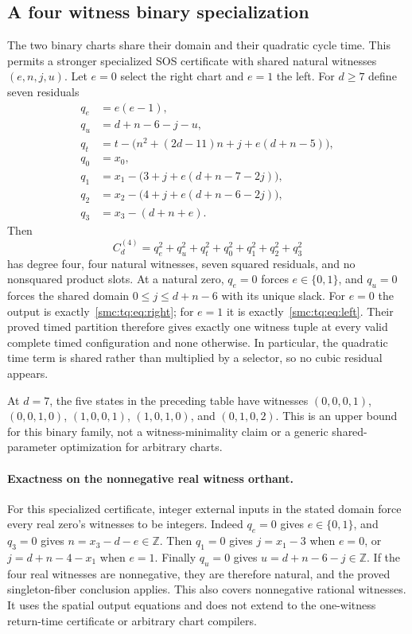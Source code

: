 \documentclass[11pt,letterpaper]{article}
\numberwithin{equation}{section}
\theoremstyle{definition}
\theoremstyle{remark}
\newcommand{\Z}{\mathbb Z}
\begin{document}
\subsection{A four witness binary specialization}\label{smc:tq:sec:fourwitness}
The two binary charts share their domain and their quadratic cycle time.
This permits a stronger specialized SOS certificate with shared natural
witnesses $(e,n,j,u)$. Let $e=0$ select the right chart and $e=1$ the left.
For $d\ge7$ define seven residuals
\begin{align*}
 q_e&=e(e-1),\\
 q_u&=d+n-6-j-u,\\
 q_t&=t-\bigl(n^2+(2d-11)n+j+e(d+n-5)\bigr),\\
 q_0&=x_0,\\
 q_1&=x_1-\bigl(3+j+e(d+n-7-2j)\bigr),\\
 q_2&=x_2-\bigl(4+j+e(d+n-6-2j)\bigr),\\
 q_3&=x_3-(d+n+e).
\end{align*}
Then
\[
 C_d^{(4)}=q_e^2+q_u^2+q_t^2+q_0^2+q_1^2+q_2^2+q_3^2
\]
has degree four, four natural witnesses, seven squared residuals, and no
nonsquared product slots. At a natural zero, $q_e=0$ forces $e\in\{0,1\}$,
and $q_u=0$ forces the shared domain $0\le j\le d+n-6$ with its unique
slack. For $e=0$ the output is exactly~\eqref{smc:tq:eq:right}; for $e=1$ it is
exactly~\eqref{smc:tq:eq:left}. Their proved timed partition therefore gives exactly
one witness tuple at every valid complete timed configuration and none
otherwise. In particular, the quadratic time term is shared rather than
multiplied by a selector, so no cubic residual appears.

At $d=7$, the five states in the preceding table have witnesses
$(0,0,0,1)$, $(0,0,1,0)$, $(1,0,0,1)$, $(1,0,1,0)$, and $(0,1,0,2)$.
This is an upper bound for this binary family, not a witness-minimality
claim or a generic shared-parameter optimization for arbitrary charts.

\paragraph{Exactness on the nonnegative real witness orthant.}
For this specialized certificate, integer external inputs in the stated
domain force every real zero's witnesses to be integers. Indeed $q_e=0$
gives $e\in\{0,1\}$, and $q_3=0$ gives $n=x_3-d-e\in\Z$. Then $q_1=0$
gives $j=x_1-3$ when $e=0$, or $j=d+n-4-x_1$ when $e=1$.
Finally $q_u=0$ gives $u=d+n-6-j\in\Z$. If the four real witnesses are
nonnegative, they are therefore natural, and the proved singleton-fiber
conclusion applies. This also covers nonnegative rational witnesses. It
uses the spatial output equations and does not extend to the one-witness
return-time certificate or arbitrary chart compilers.
\end{document}
